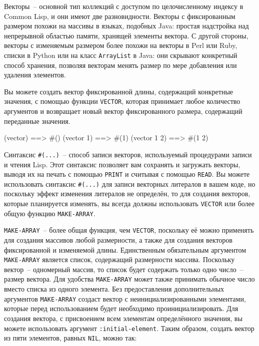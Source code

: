 Векторы~-- основной тип коллекций с доступом по целочисленному индексу в Common Lisp, и они
имеют две разновидности.  Векторы с фиксированным размером похожи на массивы в языках,
подобных Java: простая надстройка над непрерывной областью памяти, хранящей элементы
вектора. С другой стороны,
векторы с изменяемым размером более похожи на векторы в Perl или Ruby, списки в Python
или на класс \lstinline{ArrayList} в Java: они скрывают конкретный способ хранения, позволяя
векторам менять размер по мере добавления или удаления элементов.

Вы можете создать вектор фиксированной длины, содержащий конкретные значения, с помощью
функции \lstinline{VECTOR}, которая принимает любое количество аргументов и возвращает
новый вектор фиксированного размера, содержащий переданные значения.

\begin{myverb}
(vector)     ==> #()
(vector 1)   ==> #(1)
(vector 1 2) ==> #(1 2)
\end{myverb}

Синтаксис \lstinline!#(...)!~-- способ записи векторов, используемый процедурами
записи и чтения Lisp.  Этот синтаксис позволяет вам сохранять и загружать векторы,
выводя их на печать с помощью \lstinline{PRINT} и считывая с помощью \lstinline{READ}.
Вы можете использовать синтаксис \lstinline!#(...)! для
записи векторных литералов в вашем коде, но поскольку эффект изменения литералов не определён,
то для создания векторов, которые планируется изменять, вы всегда должны 
использовать \lstinline{VECTOR} или более общую функцию \lstinline{MAKE-ARRAY}.

\lstinline{MAKE-ARRAY}~-- более общая функция, чем \lstinline{VECTOR}, поскольку её можно
применять для создания массивов любой размерности, а также для создания векторов
фиксированной и изменяемой длины. Единственным обязательным аргументом \lstinline{MAKE-ARRAY}
является список, содержащий размерности массива.  Поскольку вектор~-- одномерный массив,
то список будет содержать только одно число~-- размер вектора.  Для удобства
\lstinline{MAKE-ARRAY} может также принимать обычное число вместо списка из одного элемента.
Без предоставления дополнительных аргументов \lstinline{MAKE-ARRAY} создаст вектор с
неинициализированными элементами, которые перед использованием будет необходимо
проинициализировать.  Для создания вектора, с присвоением всем
элементам определённого значения, вы можете использовать аргумент \lstinline{:initial-element}.
Таким образом, создать вектор из пяти элементов, равных \lstinline{NIL}, можно так:

